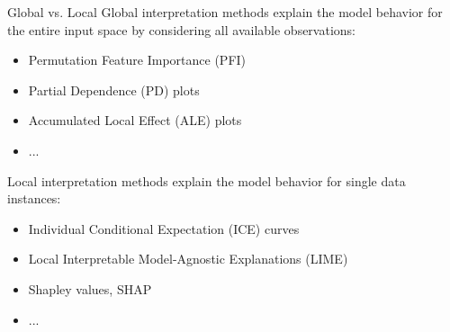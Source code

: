 \documentclass[11pt,compress,t,notes=noshow, aspectratio=169, xcolor=table]{beamer}
\begin{document}
    



\begin{frame}{Global vs. Local}
Global interpretation methods explain the model behavior for the entire input space by considering all available observations:
	\begin{itemize}
		\item Permutation Feature Importance (PFI)
		\item Partial Dependence (PD) plots
		\item Accumulated Local Effect (ALE) plots
		\item ...
	\end{itemize}
\bigskip
Local interpretation methods explain the model behavior for single data instances:
	\begin{itemize}
		\item Individual Conditional Expectation (ICE) curves
		\item Local Interpretable Model-Agnostic Explanations (LIME)
		\item Shapley values, SHAP
		\item ...
	\end{itemize}
\end{frame}

\end{document}
